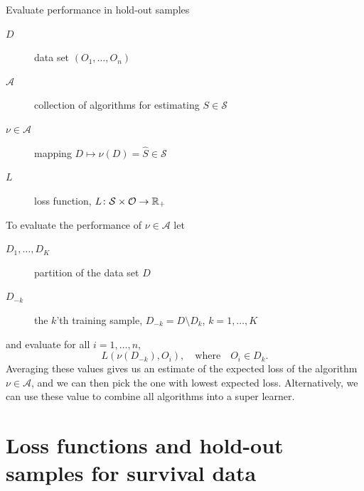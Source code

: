 \documentclass[smaller]{beamer}\usepackage{listings}
\newcommand{\est}{\ensuremath{\nu}}
\begin{document}
\begin{frame}[label={sec:orgd8dbc04}]{Evaluate performance in hold-out samples}
\small

\begin{description}
\item[{\(D\)}] data set \((O_1, \dots, O_n)\)
\item[{\(\mathcal{A}\)}] collection of algorithms for estimating \(S \in \mathcal{S}\)
\item[{\(\nu \in \mathcal{A}\)}] mapping \(D \longmapsto \est(D) = \hat S \in
  \mathcal{S}\)
\item[{\(L\)}] loss function, \(L \colon \mathcal{S} \times \mathcal{O} \rightarrow \mathbb{R}_+\)
\end{description}

\vfill
To evaluate the performance of \(\est \in \mathcal{A}\) let
\begin{description}
\item[{\(D_1, \dots, D_K\)}] partition of the data set \(D\)
\item[{\(D_{-k}\)}] the \(k\)'th training sample, \(D_{-k} = D \setminus
  D_{k}\), \(k=1, \dots, K\)
\end{description}

and evaluate for all \(i = 1, \dots, n\),
\begin{equation*}
L(\est(D_{-k}), O_i),
\quad \text{where} \quad O_i \in D_k.
\end{equation*}
Averaging these values gives us an estimate of the expected loss of the algorithm \(\nu \in
\mathcal{A}\), and we can then pick the one with lowest expected loss. Alternatively, we can use
these value to combine all algorithms into a super learner.
\end{frame}


\section{Loss functions and hold-out samples for survival data}
\label{sec:org9d2858e}
\end{document}
